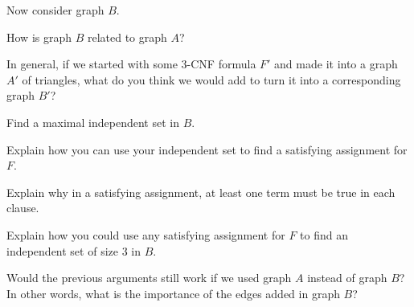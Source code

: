 \documentclass{tufte-handout}
\begin{document}
Now consider graph $B$.
\begin{questions}
\item How is graph $B$ related to graph $A$?
\item In general, if we started with some 3-CNF formula $F'$ and made it
  into a graph $A'$ of triangles, what do you think we would add to
  turn it into a corresponding graph $B'$?
\item Find a maximal independent set in $B$.
\item Explain how you can use your independent set to find a
  satisfying assignment for $F$.
\item Explain why in a satisfying assignment, at least one term must
  be true in each clause.
\item Explain how you could use any satisfying assignment for $F$ to
  find an independent set of size $3$ in $B$.
\item Would the previous arguments still work if we used graph $A$
  instead of graph $B$? In other words, what is the importance of the
  edges added in graph $B$?
\end{questions}
\end{document}
